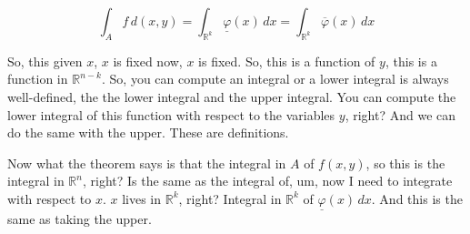 \begin{math-stroke}
\[
\int_A f \, d(x,y) = \int_{\mathbb{R}^k} \underline{\varphi}(x) \, dx = \int_{\mathbb{R}^k} \overline{\varphi}(x) \, dx
\]
\end{math-stroke}

\begin{spoken-clean}[00:18:53 - 00:19:14]
So, this given $x$, $x$ is fixed now, $x$ is fixed. So, this is a function of $y$, this is a function in $\mathbb{R}^{n-k}$. So, you can compute an integral or a lower integral is always well-defined, the the lower integral and the upper integral. You can compute the lower integral of this function with respect to the variables $y$, right? And we can do the same with the upper. These are definitions.
\end{spoken-clean}

\begin{spoken-clean}[00:19:14 - 00:19:53]
Now what the theorem says is that the integral in $A$ of $f(x,y)$, so this is the integral in $\mathbb{R}^n$, right? Is the same as the integral of, um, now I need to integrate with respect to $x$. $x$ lives in $\mathbb{R}^k$, right? Integral in $\mathbb{R}^k$ of $\underline{\varphi}(x) \, dx$. And this is the same as taking the upper.
\end{spoken-clean}

